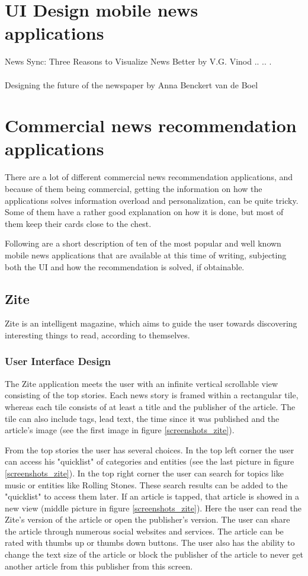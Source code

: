 \section{UI Design mobile news applications}
News Sync: Three Reasons to Visualize News Better by V.G. Vinod .. .. .
\\\\
Designing the future of the newspaper by Anna Benckert van de Boel

\section{Commercial news recommendation applications}
There are a lot of different commercial news recommendation applications, and because of them being commercial, getting the information on how the applications solves information overload and personalization, can be quite tricky. Some of them have a rather good explanation on how it is done, but most of them keep their cards close to the chest.

Following are a short description of ten of the most popular and well known mobile news applications that are available at this time of writing, subjecting both the UI and how the recommendation is solved, if obtainable.


\subsection{Zite}
Zite is an intelligent magazine, which aims to guide the user towards discovering interesting things to read\cite{zite_appstore}, according to themselves.

\subsubsection{User Interface Design}
The Zite application meets the user with an infinite vertical scrollable view consisting of the top stories. Each news story is framed within a rectangular tile, whereas each tile consists of at least a title and the publisher of the article. The tile can also include tags, lead text, the time since it was published and the article's image (see the first image in figure \ref{screenshots_zite}).

From the top stories the user has several choices. In the top left corner the user can access his "quicklist" of categories and entities (see the last picture in figure \ref{screenshots_zite}). In the top right corner the user can search for topics like music or entities like Rolling Stones. These search results can be added to the "quicklist" to access them later. If an article is tapped, that article is showed in a new view (middle picture in figure \ref{screenshots_zite}). Here the user can read the Zite's version of the article or open the publisher's version. The user can share the article through numerous social websites and services. The article can be rated with thumbs up or thumbs down buttons. The user also has the ability to change the text size of the article or block the publisher of the article to never get another article from this publisher from this screen.

